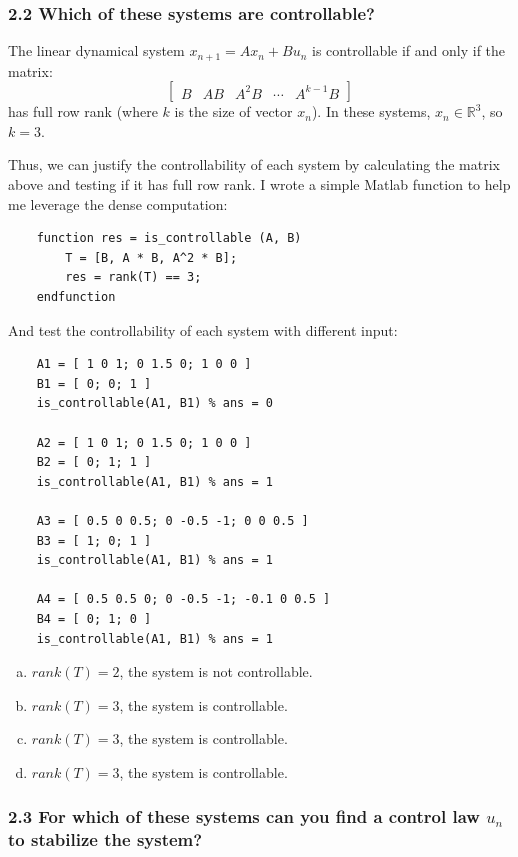 \subsubsection*{2.2 Which of these systems are controllable?}
The linear dynamical system \( x_{n+1} = A x_n + B u_n \) is controllable if and only if the matrix:
\[
    \begin{bmatrix}
        B & AB & A^2 B & \cdots & A^{k-1} B
    \end{bmatrix}
\]
has full row rank (where \( k \) is the size of vector \( x_n \)). In these systems, \( x_n \in \mathbb{R}^3 \), so \( k=3 \).

Thus, we can justify the controllability of each system by calculating the matrix above and testing if it has full row rank. I wrote a simple Matlab function to help me leverage the dense computation:

\begin{verbatim}
    function res = is_controllable (A, B)
        T = [B, A * B, A^2 * B];
        res = rank(T) == 3;
    endfunction
\end{verbatim}

And test the controllability of each system with different input:

\begin{verbatim}
    A1 = [ 1 0 1; 0 1.5 0; 1 0 0 ]
    B1 = [ 0; 0; 1 ]
    is_controllable(A1, B1) % ans = 0

    A2 = [ 1 0 1; 0 1.5 0; 1 0 0 ]
    B2 = [ 0; 1; 1 ]
    is_controllable(A1, B1) % ans = 1

    A3 = [ 0.5 0 0.5; 0 -0.5 -1; 0 0 0.5 ]
    B3 = [ 1; 0; 1 ]
    is_controllable(A1, B1) % ans = 1

    A4 = [ 0.5 0.5 0; 0 -0.5 -1; -0.1 0 0.5 ]
    B4 = [ 0; 1; 0 ]
    is_controllable(A1, B1) % ans = 1
\end{verbatim}

\begin{enumerate}[(a)]
    \item \( rank(T) = 2 \), the system is not controllable.
    \item \( rank(T) = 3 \), the system is controllable.
    \item \( rank(T) = 3 \), the system is controllable.
    \item \( rank(T) = 3 \), the system is controllable.
\end{enumerate}


\subsubsection*{2.3 For which of these systems can you find a control law \( u_n \) to stabilize the system?}

